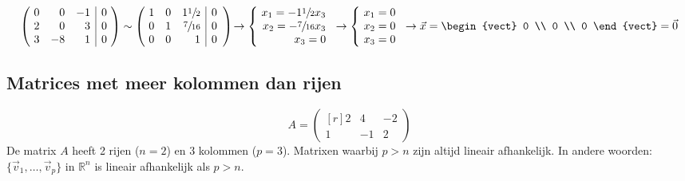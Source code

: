 \[ \left(\! \begin{array}{rrr|r}
	0 & 0 & -1 & 0 \\
	2 & 0 & 3 & 0 \\
	3 & -8 & 1 & 0
\end{array}\!\right) \sim \left(\! \begin{array}{rrr|r}
	1 & 0 & 1\sfrac{1}{2} & 0 \\
	0 & 1 & \sfrac{7}{16} & 0 \\
	0 & 0 & 1 & 0
\end{array} \right)\! \to \left\{\! \begin{array}{r}
	x_1 = -1\sfrac{1}{2} x_3 \\
	x_2 = -\sfrac{7}{16} x_3 \\
	x_3 = 0
\end{array} \right. \to \left\{\! \begin{array}{r}
	x_1 = 0 \\
	x_2 = 0 \\
	x_3 = 0
\end{array} \right. \to \vec{x} = \begin{vect} 0 \\ 0 \\ 0 \end{vect} = \vec{0} \]

\subsection{Matrices met meer kolommen dan rijen}
\[A = \begin{pmatrix*}[r]
	2 & 4 & -2 \\
	1 & -1 & 2
\end{pmatrix*} \]
De matrix $A$ heeft 2 rijen ($n = 2$) en 3 kolommen ($p = 3$). Matrixen waarbij $p > n$ zijn altijd lineair afhankelijk. In andere woorden: $\{ \vec{v}_1, \ldots, \vec{v}_p \}$ in $\mathbb{R}^n$ is lineair afhankelijk als $p > n$.